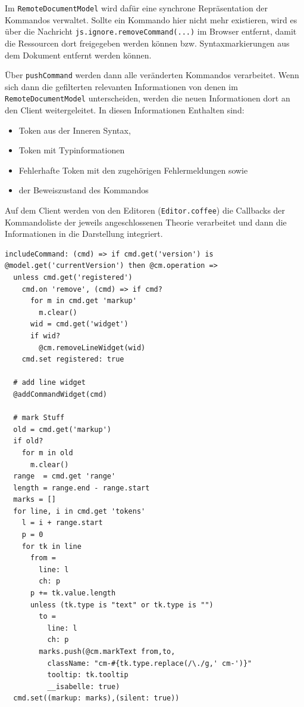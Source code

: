 Im \texttt{RemoteDocumentModel} wird dafür eine synchrone Repräsentation der Kommandos verwaltet.
Sollte ein Kommando hier nicht mehr existieren, wird es über die Nachricht
\texttt{js.ignore.removeCommand(...)} im Browser entfernt, damit die Ressourcen dort freigegeben
werden können bzw. Syntaxmarkierungen aus dem Dokument entfernt werden können.

Über \texttt{pushCommand} werden dann alle veränderten Kommandos verarbeitet. Wenn sich dann die
gefilterten relevanten Informationen von denen im \texttt{RemoteDocumentModel} unterscheiden,
werden die neuen Informationen dort an den Client weitergeleitet. In diesen Informationen Enthalten
sind:

\begin{itemize}
  \item Token aus der Inneren Syntax,
  \item Token mit Typinformationen
  \item Fehlerhafte Token mit den zugehörigen Fehlermeldungen sowie
  \item der Beweiszustand des Kommandos
\end{itemize}

Auf dem Client werden von den Editoren (\texttt{Editor.coffee}) die Callbacks der Kommandoliste der
jeweils angeschlossenen Theorie verarbeitet und dann die Informationen in die Darstellung
integriert.

\begin{lstlisting}
includeCommand: (cmd) => if cmd.get('version') is @model.get('currentVersion') then @cm.operation =>
  unless cmd.get('registered')      
    cmd.on 'remove', (cmd) => if cmd?
      for m in cmd.get 'markup'
        m.clear()
      wid = cmd.get('widget')
      if wid?
        @cm.removeLineWidget(wid)
    cmd.set registered: true

  # add line widget
  @addCommandWidget(cmd)

  # mark Stuff
  old = cmd.get('markup')
  if old?
    for m in old
      m.clear()
  range  = cmd.get 'range'
  length = range.end - range.start
  marks = []
  for line, i in cmd.get 'tokens'
    l = i + range.start
    p = 0
    for tk in line
      from = 
        line: l
        ch: p
      p += tk.value.length
      unless (tk.type is "text" or tk.type is "")
        to =
          line: l
          ch: p              
        marks.push(@cm.markText from,to,
          className: "cm-#{tk.type.replace(/\./g,' cm-')}"
          tooltip: tk.tooltip
          __isabelle: true)
  cmd.set((markup: marks),(silent: true))
\end{lstlisting}



